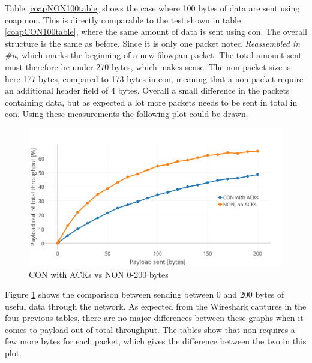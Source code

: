 \noindent Table \ref{coapNON100table} shows the case where 100 bytes of data are sent using \gls{coap} \gls{non}. This is directly comparable to the test shown in table \ref{coapCON100table}, where the same amount of data is sent using \gls{con}. The overall structure is the same as before. Since it is only one packet noted \textit{Reassembled in \#n}, which marks the beginning of a new \gls{6lowpan} packet. The total amount sent must therefore be under 270 bytes, which makes sense. The \gls{non} packet size is here 177 bytes, compared to 173 bytes in \gls{con}, meaning that a \gls{non} packet require an additional header field of 4 bytes. Overall a small difference in the packets containing data, but as expected a lot more packets needs to be sent in total in \gls{con}. Using these measurements the following plot could be drawn. 





\begin{figure}[ht]
    \centering
    \includegraphics[width=1.0\textwidth]{CONNONvs0-200acks.png}    
    \caption{CON with ACKs vs NON 0-200 bytes}
    \label{fig:CONvsNON0-200_acks}
\end{figure}

\noindent Figure \ref{fig:CONvsNON0-200_acks} shows the comparison between sending between 0 and 200 bytes of useful data through the network. As expected from the Wireshark captures in the four previous tables, there are no major differences between these graphs when it comes to payload out of total throughput. The tables show that \gls{non} requires a few more bytes for each packet, which gives the difference between the two in this plot. 




